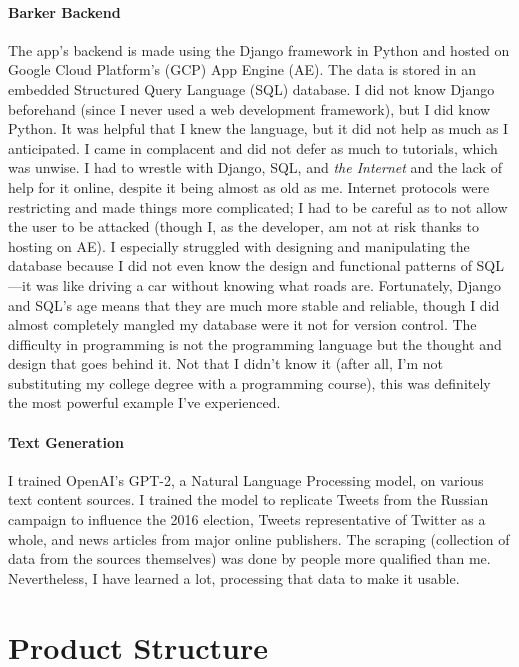 \documentclass[12pt, letterpaper]{article}
\begin{document}
\paragraph{Barker Backend}The app's backend is made using the Django framework in Python and hosted on Google Cloud Platform's (GCP) App Engine (AE). The data is stored in an embedded Structured Query Language (SQL) database. I did not know Django beforehand (since I never used a web development framework), but I did know Python. It was helpful that I knew the language, but it did not help as much as I anticipated. I came in complacent and did not defer as much to tutorials, which was unwise. I had to wrestle with Django, SQL, and \emph{the Internet} and the lack of help for it online, despite it being almost as old as me. Internet protocols were restricting and made things more complicated; I had to be careful as to not allow the user to be attacked (though I, as the developer, am not at risk thanks to hosting on AE). I especially struggled with designing and manipulating the database because I did not even know the design and functional patterns of SQL---it was like driving a car without knowing what roads are. Fortunately, Django and SQL's age means that they are much more stable and reliable, though I did almost completely mangled my database were it not for version control. The difficulty in programming is not the programming language but the thought and design that goes behind it. Not that I didn't know it (after all, I'm not substituting my college degree with a programming course), this was definitely the most powerful example I've experienced.

\paragraph{Text Generation}I trained OpenAI's GPT-2, a Natural Language Processing model, on various text content sources. I trained the model to replicate Tweets from the Russian campaign to influence the 2016 election, Tweets representative of Twitter as a whole, and news articles from major online publishers. The scraping (collection of data from the sources themselves) was done by people more qualified than me. Nevertheless, I have learned a lot, processing that data to make it usable. 


\section{Product Structure} 
\end{document}
